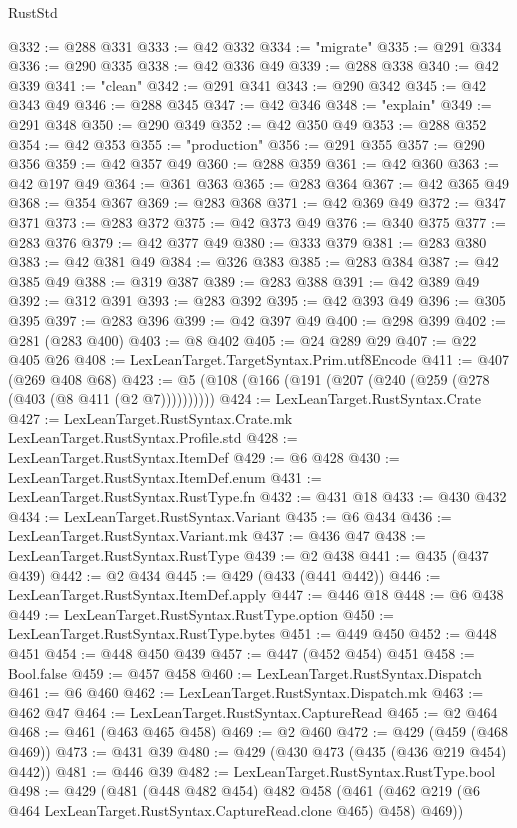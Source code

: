 \begin{lexlean}{RustStd}
\begin{coremodule}
{\begin{coremodule}
{{{{{{{{{{{{{@332 := @288 @331
@333 := @42 @332
@334 := "migrate"
@335 := @291 @334
@336 := @290 @335
@338 := @42 @336 @49
@339 := @288 @338
@340 := @42 @339
@341 := "clean"
@342 := @291 @341
@343 := @290 @342
@345 := @42 @343 @49
@346 := @288 @345
@347 := @42 @346
@348 := "explain"
@349 := @291 @348
@350 := @290 @349
@352 := @42 @350 @49
@353 := @288 @352
@354 := @42 @353
@355 := "production"
@356 := @291 @355
@357 := @290 @356
@359 := @42 @357 @49
@360 := @288 @359
@361 := @42 @360
@363 := @42 @197 @49
@364 := @361 @363
@365 := @283 @364
@367 := @42 @365 @49
@368 := @354 @367
@369 := @283 @368
@371 := @42 @369 @49
@372 := @347 @371
@373 := @283 @372
@375 := @42 @373 @49
@376 := @340 @375
@377 := @283 @376
@379 := @42 @377 @49
@380 := @333 @379
@381 := @283 @380
@383 := @42 @381 @49
@384 := @326 @383
@385 := @283 @384
@387 := @42 @385 @49
@388 := @319 @387
@389 := @283 @388
@391 := @42 @389 @49
@392 := @312 @391
@393 := @283 @392
@395 := @42 @393 @49
@396 := @305 @395
@397 := @283 @396
@399 := @42 @397 @49
@400 := @298 @399
@402 := @281 (@283 @400)
@403 := @8 @402
@405 := @24 @289 @29
@407 := @22 @405 @26
@408 := LexLeanTarget.TargetSyntax.Prim.utf8Encode
@411 := @407 (@269 @408 @68)
@423 := @5 (@108 (@166 (@191 (@207 (@240 (@259 (@278 (@403 (@8 @411 (@2 @7))))))))))
@424 := LexLeanTarget.RustSyntax.Crate
@427 := LexLeanTarget.RustSyntax.Crate.mk LexLeanTarget.RustSyntax.Profile.std
@428 := LexLeanTarget.RustSyntax.ItemDef
@429 := @6 @428
@430 := LexLeanTarget.RustSyntax.ItemDef.enum
@431 := LexLeanTarget.RustSyntax.RustType.fn
@432 := @431 @18
@433 := @430 @432
@434 := LexLeanTarget.RustSyntax.Variant
@435 := @6 @434
@436 := LexLeanTarget.RustSyntax.Variant.mk
@437 := @436 @47
@438 := LexLeanTarget.RustSyntax.RustType
@439 := @2 @438
@441 := @435 (@437 @439)
@442 := @2 @434
@445 := @429 (@433 (@441 @442))
@446 := LexLeanTarget.RustSyntax.ItemDef.apply
@447 := @446 @18
@448 := @6 @438
@449 := LexLeanTarget.RustSyntax.RustType.option
@450 := LexLeanTarget.RustSyntax.RustType.bytes
@451 := @449 @450
@452 := @448 @451
@454 := @448 @450 @439
@457 := @447 (@452 @454) @451
@458 := Bool.false
@459 := @457 @458
@460 := LexLeanTarget.RustSyntax.Dispatch
@461 := @6 @460
@462 := LexLeanTarget.RustSyntax.Dispatch.mk
@463 := @462 @47
@464 := LexLeanTarget.RustSyntax.CaptureRead
@465 := @2 @464
@468 := @461 (@463 @465 @458)
@469 := @2 @460
@472 := @429 (@459 (@468 @469))
@473 := @431 @39
@480 := @429 (@430 @473 (@435 (@436 @219 @454) @442))
@481 := @446 @39
@482 := LexLeanTarget.RustSyntax.RustType.bool
@498 := @429
    (@481
      (@448 @482 @454)
      @482
      @458
      (@461 (@462 @219 (@6 @464 LexLeanTarget.RustSyntax.CaptureRead.clone @465) @458) @469))
}}}}}}}}}}}}}
\end{coremodule}}
\end{coremodule}
\end{lexlean}
